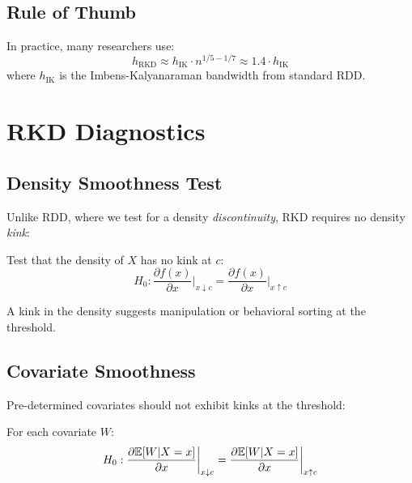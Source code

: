 \subsection{Rule of Thumb}

In practice, many researchers use:
\begin{equation}
    h_{\text{RKD}} \approx h_{\text{IK}} \cdot n^{1/5 - 1/7} \approx 1.4 \cdot h_{\text{IK}}
\end{equation}
where $h_{\text{IK}}$ is the Imbens-Kalyanaraman bandwidth from standard RDD.

\section{RKD Diagnostics}
\label{sec:rkd_diagnostics}

\subsection{Density Smoothness Test}

Unlike RDD, where we test for a density \emph{discontinuity}, RKD requires no density \emph{kink}:

\begin{definition}
\label{def:density_smoothness}
Test that the density of $X$ has no kink at $c$:
\begin{equation}
    H_0: \frac{\partial f(x)}{\partial x}\bigg|_{x \downarrow c} = \frac{\partial f(x)}{\partial x}\bigg|_{x \uparrow c}
\end{equation}
\end{definition}

A kink in the density suggests manipulation or behavioral sorting at the threshold.

\subsection{Covariate Smoothness}

Pre-determined covariates should not exhibit kinks at the threshold:

\begin{definition}
For each covariate $W$:
\begin{equation}
    H_0: \frac{\partial \mathbb{E}[W|X=x]}{\partial x}\bigg|_{x \downarrow c} = \frac{\partial \mathbb{E}[W|X=x]}{\partial x}\bigg|_{x \uparrow c}
\end{equation}
\end{definition}


